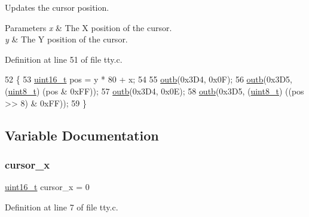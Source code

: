 Updates the cursor position. 


\begin{DoxyParams}{Parameters}
{\em x} & The X position of the cursor. \\
\hline
{\em y} & The Y position of the cursor. \\
\hline
\end{DoxyParams}


Definition at line 51 of file tty.\+c.


\begin{DoxyCode}
52 \{
53     \hyperlink{a00134_a273cf69d639a59973b6019625df33e30_a273cf69d639a59973b6019625df33e30}{uint16\_t} pos = y * 80 + x;
54  
55     \hyperlink{a00158_aa37f5841c54156a4b14fc0d6f626b44f_aa37f5841c54156a4b14fc0d6f626b44f}{outb}(0x3D4, 0x0F);
56     \hyperlink{a00158_aa37f5841c54156a4b14fc0d6f626b44f_aa37f5841c54156a4b14fc0d6f626b44f}{outb}(0x3D5, (\hyperlink{a00134_aba7bc1797add20fe3efdf37ced1182c5_aba7bc1797add20fe3efdf37ced1182c5}{uint8\_t}) (pos & 0xFF));
57     \hyperlink{a00158_aa37f5841c54156a4b14fc0d6f626b44f_aa37f5841c54156a4b14fc0d6f626b44f}{outb}(0x3D4, 0x0E);
58     \hyperlink{a00158_aa37f5841c54156a4b14fc0d6f626b44f_aa37f5841c54156a4b14fc0d6f626b44f}{outb}(0x3D5, (\hyperlink{a00134_aba7bc1797add20fe3efdf37ced1182c5_aba7bc1797add20fe3efdf37ced1182c5}{uint8\_t}) ((pos >> 8) & 0xFF));
59 \}
\end{DoxyCode}


\subsection{Variable Documentation}
\mbox{\label{a00167_ae69604af0f9bd5fca2a016d0aa1ba7e1_ae69604af0f9bd5fca2a016d0aa1ba7e1}} 
\subsubsection{\texorpdfstring{cursor\+\_\+x}{cursor\_x}}
{\footnotesize\ttfamily \hyperlink{a00134_a273cf69d639a59973b6019625df33e30_a273cf69d639a59973b6019625df33e30}{uint16\+\_\+t} cursor\+\_\+x = 0}



Definition at line 7 of file tty.\+c.

\mbox{\label{a00167_a0301c5492919c401c2c1ecf52af709b0_a0301c5492919c401c2c1ecf52af709b0}} 
